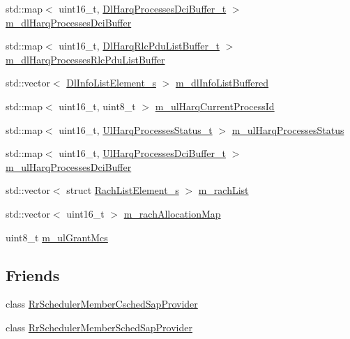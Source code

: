 \begin{DoxyCompactItemize}
std\+::map$<$ uint16\+\_\+t, \hyperlink{namespacens3_af25599bf8f9f564075c005759c9af18c}{Dl\+Harq\+Processes\+Dci\+Buffer\+\_\+t} $>$ \hyperlink{classns3_1_1RrFfMacScheduler_a6611390f9589d1df0b0f4c0932219eeb}{m\+\_\+dl\+Harq\+Processes\+Dci\+Buffer}
\item 
std\+::map$<$ uint16\+\_\+t, \hyperlink{namespacens3_a4c0cbd1e72f1c667f8b5879655f13210}{Dl\+Harq\+Rlc\+Pdu\+List\+Buffer\+\_\+t} $>$ \hyperlink{classns3_1_1RrFfMacScheduler_a2a6afd0a7df7a71c20382176f6cc9573}{m\+\_\+dl\+Harq\+Processes\+Rlc\+Pdu\+List\+Buffer}
\item 
std\+::vector$<$ \hyperlink{structns3_1_1DlInfoListElement__s}{Dl\+Info\+List\+Element\+\_\+s} $>$ \hyperlink{classns3_1_1RrFfMacScheduler_a4176ffb0eba681a3e3b5be0be1a30771}{m\+\_\+dl\+Info\+List\+Buffered}
\item 
std\+::map$<$ uint16\+\_\+t, uint8\+\_\+t $>$ \hyperlink{classns3_1_1RrFfMacScheduler_ad7674f8cb560202bc36a792f7b2755ca}{m\+\_\+ul\+Harq\+Current\+Process\+Id}
\item 
std\+::map$<$ uint16\+\_\+t, \hyperlink{namespacens3_af765c4daaafe4ea4809c1041fc196629}{Ul\+Harq\+Processes\+Status\+\_\+t} $>$ \hyperlink{classns3_1_1RrFfMacScheduler_a13fbe24878639869771e77ff813373ff}{m\+\_\+ul\+Harq\+Processes\+Status}
\item 
std\+::map$<$ uint16\+\_\+t, \hyperlink{namespacens3_a042cbd6bf67e73911cba35b8c070223d}{Ul\+Harq\+Processes\+Dci\+Buffer\+\_\+t} $>$ \hyperlink{classns3_1_1RrFfMacScheduler_a530849c4c8d3d5b0796e6af3d8d95173}{m\+\_\+ul\+Harq\+Processes\+Dci\+Buffer}
\item 
std\+::vector$<$ struct \hyperlink{structns3_1_1RachListElement__s}{Rach\+List\+Element\+\_\+s} $>$ \hyperlink{classns3_1_1RrFfMacScheduler_a471cdca79a50c90f7c871c15d02755fc}{m\+\_\+rach\+List}
\item 
std\+::vector$<$ uint16\+\_\+t $>$ \hyperlink{classns3_1_1RrFfMacScheduler_ac3a35483a21997065f49ff72707a90aa}{m\+\_\+rach\+Allocation\+Map}
\item 
uint8\+\_\+t \hyperlink{classns3_1_1RrFfMacScheduler_ac03ec32deb759ca862b6ab9475929798}{m\+\_\+ul\+Grant\+Mcs}
\end{DoxyCompactItemize}
\subsection*{Friends}
\begin{DoxyCompactItemize}
\item 
class \hyperlink{classns3_1_1RrFfMacScheduler_a4369f8386b07b8069d41717aa39cc5f9}{Rr\+Scheduler\+Member\+Csched\+Sap\+Provider}
\item 
class \hyperlink{classns3_1_1RrFfMacScheduler_a56c52dd0d9960e3dd7af10de9928d1df}{Rr\+Scheduler\+Member\+Sched\+Sap\+Provider}
\end{DoxyCompactItemize}
